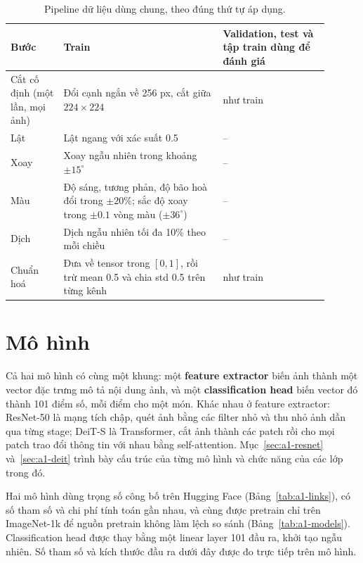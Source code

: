 \documentclass[11pt,a4paper]{article}
\begin{document}
\begin{table}[!htbp]
\centering
\small
\begin{tabular}{p{0.15\linewidth}p{0.45\linewidth}p{0.30\linewidth}}
\toprule
Bước & Train & Validation, test và tập train dùng để đánh giá \\
\midrule
Cắt cố định (một lần, mọi ảnh) & Đổi cạnh ngắn về 256 px, cắt giữa \(224\times224\) & như train \\
Lật & Lật ngang với xác suất 0.5 & -- \\
Xoay & Xoay ngẫu nhiên trong khoảng \(\pm15^\circ\) & -- \\
Màu & Độ sáng, tương phản, độ bão hoà đổi trong \(\pm20\%\); sắc độ xoay trong \(\pm0.1\) vòng màu (\(\pm36^\circ\)) & -- \\
Dịch & Dịch ngẫu nhiên tối đa 10\% theo mỗi chiều & -- \\
Chuẩn hoá & Đưa về tensor trong \([0,1]\), rồi trừ mean 0.5 và chia std 0.5 trên từng kênh & như train \\
\bottomrule
\end{tabular}
\caption{Pipeline dữ liệu dùng chung, theo đúng thứ tự áp dụng.}
\label{tab:a1-pipeline}
\end{table}


\section{Mô hình}\label{sec:a1-models}
Cả hai mô hình có cùng một khung: một \textbf{feature extractor} biến ảnh thành một vector đặc trưng mô tả nội dung ảnh, và một \textbf{classification head} biến vector đó thành 101 điểm số, mỗi điểm cho một món. Khác nhau ở feature extractor: ResNet-50 là mạng tích chập, quét ảnh bằng các filter nhỏ và thu nhỏ ảnh dần qua từng stage; DeiT-S là Transformer, cắt ảnh thành các patch rồi cho mọi patch trao đổi thông tin với nhau bằng self-attention. Mục~\ref{sec:a1-resnet} và~\ref{sec:a1-deit} trình bày cấu trúc của từng mô hình và chức năng của các lớp trong đó.

Hai mô hình dùng trọng số công bố trên Hugging Face (Bảng~\ref{tab:a1-links}), có số tham số và chi phí tính toán gần nhau, và cùng được pretrain chỉ trên ImageNet-1k để nguồn pretrain không làm lệch so sánh (Bảng~\ref{tab:a1-models}). Classification head được thay bằng một linear layer 101 đầu ra, khởi tạo ngẫu nhiên. Số tham số và kích thước đầu ra dưới đây được đo trực tiếp trên mô hình.
\end{document}

